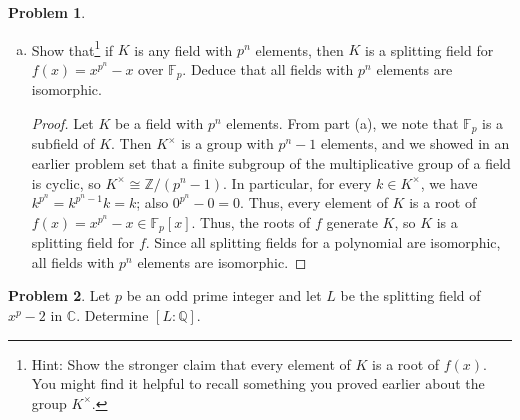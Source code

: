 \documentclass[11pt]{article}
\newcommand{\C}{\mathbb{C}}
\newcommand{\Q}{\mathbb{Q}}
\newcommand{\Z}{\mathbb{Z}}
\newcommand{\F}{\mathbb{F}}
\theoremstyle{definition}
\newtheorem{problem}{Problem}
\begin{document}
\begin{problem}
\begin{enumerate}[(a)]
\begin{proof}
Let $E$ denote the roots of $f$ in $\overline{\mathbb{F}_p}$. Since $\F_p[x]$ has prime characteristic $p$, the Frobenius map $h_n\!: \overline{\mathbb{F}_p} \to \overline{\mathbb{F}_p}$ defined by $h_n(a) \colonequals a^{p^n}$ for all $a \in \overline{\mathbb{F}_p}$ is a ring homomorphism. Then
\begin{itemize}
\item $f(0) = 0^{p^n}-0 = 0$ and $f(1)=1^{p^n}-1 = 0$, so $0,1\in E$.
\item If $a,b\in E$, then $h_n(a-b) = h_n(a) - h_n(b)$, so 
\[ f(a-b) = h_n(a-b) - (a-b) = h_n(a) -a - h_n(b)+ b = f(a) - f(b) = 0 - 0 = 0,\] so $a-b\in E$.
\item If $a,b\in E$, then $h_n(ab) = h_n(a)h_n(b)$, so
\[ f(ab) = h_n(ab) - (ab) = h_n(a)h_n(b) -ab = (h_n(a) -a)h_n(b) - a(h_n(b)-b)  = f(a) h_n(b) - a f(b) = 0,\] so $ab\in E$.
\end{itemize}
Thus, $E$ is a subring of $\overline{\mathbb{F}_p}$. In particular, $E$ is a domain, and is finite, so $E$ is a field. In particular $E$ is a field with $p^n$ elements.
\end{proof}
\item Show that\footnote{Hint: Show the stronger claim that every element of $K$ is a root of $f(x)$. You might find it helpful to recall something you proved earlier about the group $K^\times$.} if $K$ is any field with $p^n$ elements, then $K$ is a splitting field for $f(x)=x^{p^n}-x$ over $\mathbb{F}_p$. Deduce that all fields with $p^n$ elements are isomorphic.
\begin{proof}
Let $K$ be a field with $p^n$ elements. From part (a), we note that $\F_p$ is a subfield of $K$. Then $K^\times$ is a group with $p^n-1$ elements, and we showed in an earlier problem set that a finite subgroup of the multiplicative group of a field is cyclic, so $K^\times\cong \Z/(p^n-1)$. In particular, for every $k\in K^\times$, we have $k^{p^n} = k^{p^n-1} k = k$; also $0^{p^n} - 0 = 0$. Thus, every element of $K$ is a root of $f(x) = x^{p^n}-x \in \F_p[x]$. Thus, the roots of $f$ generate $K$, so $K$ is a splitting field for $f$. Since all splitting fields for a polynomial are isomorphic, all fields with $p^n$ elements are isomorphic.
\end{proof}
\end{enumerate}
\end{problem}


\begin{problem}
Let $p$ be an odd prime integer and let $L$ be the splitting field of $x^p-2$ in $\C$. Determine $[L:\Q]$.
\end{problem}
\end{document}
